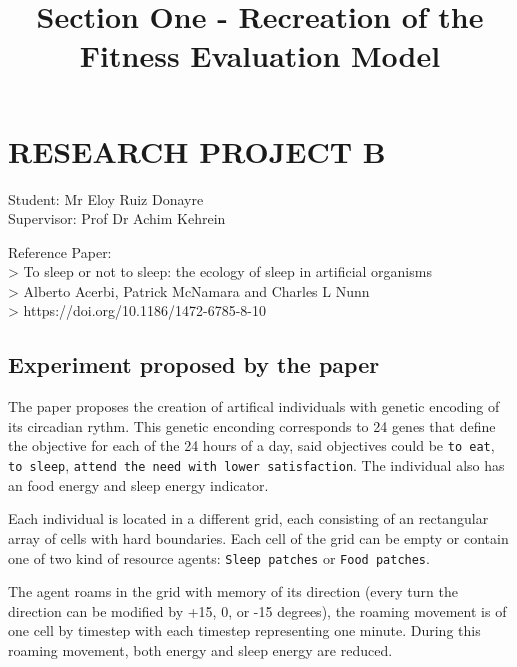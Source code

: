 \documentclass[11pt]{article}
\title{Section One - Recreation of the Fitness Evaluation Model}
\begin{document}
    
    
    \maketitle
    
    

    
    \hypertarget{research-project-b}{%
\section{RESEARCH PROJECT B}\label{research-project-b}}

Student: Mr Eloy Ruiz Donayre\\
Supervisor: Prof Dr Achim Kehrein

Reference Paper:\\
\textgreater{} To sleep or not to sleep: the ecology of sleep in
artificial organisms\\
\textgreater{} Alberto Acerbi, Patrick McNamara and Charles L Nunn\\
\textgreater{} https://doi.org/10.1186/1472-6785-8-10

    \hypertarget{experiment-proposed-by-the-paper}{%
\subsection{Experiment proposed by the
paper}\label{experiment-proposed-by-the-paper}}

The paper proposes the creation of artifical individuals with genetic
encoding of its circadian rythm. This genetic enconding corresponds to
24 genes that define the objective for each of the 24 hours of a day,
said objectives could be
\texttt{\textquotesingle{}to\ eat\textquotesingle{}},
\texttt{\textquotesingle{}to\ sleep\textquotesingle{}},
\texttt{\textquotesingle{}attend\ the\ need\ with\ lower\ satisfaction\textquotesingle{}}.
The individual also has an food energy and sleep energy indicator.

Each individual is located in a different grid, each consisting of an
rectangular array of cells with hard boundaries. Each cell of the grid
can be empty or contain one of two kind of resource agents:
\texttt{Sleep\ patches} or \texttt{Food\ patches}.

The agent roams in the grid with memory of its direction (every turn the
direction can be modified by +15, 0, or -15 degrees), the roaming
movement is of one cell by timestep with each timestep representing one
minute. During this roaming movement, both energy and sleep energy are
reduced.
\end{document}
